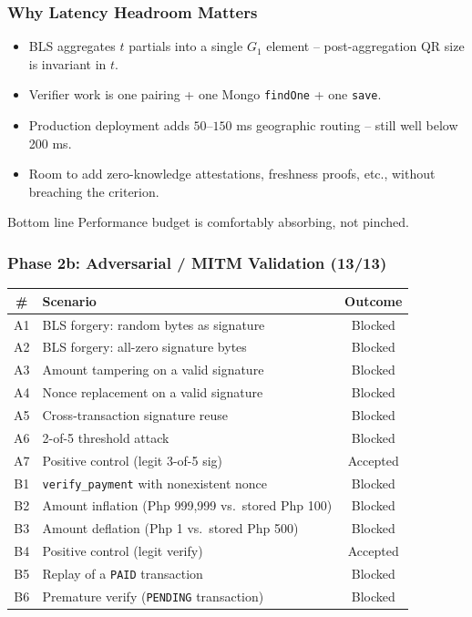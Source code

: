 \documentclass{beamer}
\newcommand{\pos}[1]{\textcolor{positive}{#1}}
\newcommand{\HL}[1]{\textcolor{emphasis}{#1}}
\begin{document}
\begin{frame}
  \frametitle{Why Latency Headroom Matters}
  \begin{itemize}
      \item BLS aggregates $t$ partials into a \HL{single $G_1$ element} -- post-aggregation QR size is invariant in $t$.
      \item Verifier work is one pairing + one Mongo \texttt{findOne} + one \texttt{save}.
      \item Production deployment adds $50$--$150$ ms geographic routing -- still well below 200 ms.
      \item Room to add zero-knowledge attestations, freshness proofs, etc., without breaching the criterion.
  \end{itemize}
  \vspace{0.1cm}
  \begin{block}{Bottom line}
    Performance budget is \HL{comfortably absorbing}, not pinched.
  \end{block}
\end{frame}

\begin{frame}
  \frametitle{Phase 2b: Adversarial / MITM Validation (13/13)}
  \begin{center}
  \scriptsize
  \begin{tabular}{|c|l|c|}
    \hline
    \# & Scenario & Outcome \\\hline
    A1 & BLS forgery: random bytes as signature & \pos{Blocked} \\\hline
    A2 & BLS forgery: all-zero signature bytes & \pos{Blocked} \\\hline
    A3 & Amount tampering on a valid signature & \pos{Blocked} \\\hline
    A4 & Nonce replacement on a valid signature & \pos{Blocked} \\\hline
    A5 & Cross-transaction signature reuse & \pos{Blocked} \\\hline
    A6 & 2-of-5 threshold attack & \pos{Blocked} \\\hline
    A7 & Positive control (legit 3-of-5 sig) & \pos{Accepted} \\\hline
    B1 & \texttt{verify\_payment} with nonexistent nonce & \pos{Blocked} \\\hline
    B2 & Amount inflation (Php 999{,}999 vs.\ stored Php 100) & \pos{Blocked} \\\hline
    B3 & Amount deflation (Php 1 vs.\ stored Php 500) & \pos{Blocked} \\\hline
    B4 & Positive control (legit verify) & \pos{Accepted} \\\hline
    B5 & Replay of a \texttt{PAID} transaction & \pos{Blocked} \\\hline
    B6 & Premature verify (\texttt{PENDING} transaction) & \pos{Blocked} \\\hline
  \end{tabular}
  \end{center}
\end{frame}
\end{document}

